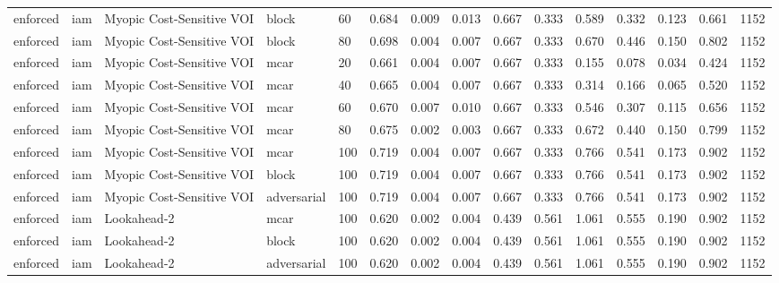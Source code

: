 \begin{table}[!ht]
{\begin{tabular}{lllllllllllllll}
enforced & iam & Myopic Cost-Sensitive VOI & block & 60 & 0.684 & 0.009 & 0.013 & 0.667 & 0.333 & 0.589 & 0.332 & 0.123 & 0.661 & 1152 \\
enforced & iam & Myopic Cost-Sensitive VOI & block & 80 & 0.698 & 0.004 & 0.007 & 0.667 & 0.333 & 0.670 & 0.446 & 0.150 & 0.802 & 1152 \\
enforced & iam & Myopic Cost-Sensitive VOI & mcar & 20 & 0.661 & 0.004 & 0.007 & 0.667 & 0.333 & 0.155 & 0.078 & 0.034 & 0.424 & 1152 \\
enforced & iam & Myopic Cost-Sensitive VOI & mcar & 40 & 0.665 & 0.004 & 0.007 & 0.667 & 0.333 & 0.314 & 0.166 & 0.065 & 0.520 & 1152 \\
enforced & iam & Myopic Cost-Sensitive VOI & mcar & 60 & 0.670 & 0.007 & 0.010 & 0.667 & 0.333 & 0.546 & 0.307 & 0.115 & 0.656 & 1152 \\
enforced & iam & Myopic Cost-Sensitive VOI & mcar & 80 & 0.675 & 0.002 & 0.003 & 0.667 & 0.333 & 0.672 & 0.440 & 0.150 & 0.799 & 1152 \\
enforced & iam & Myopic Cost-Sensitive VOI & mcar & 100 & 0.719 & 0.004 & 0.007 & 0.667 & 0.333 & 0.766 & 0.541 & 0.173 & 0.902 & 1152 \\
enforced & iam & Myopic Cost-Sensitive VOI & block & 100 & 0.719 & 0.004 & 0.007 & 0.667 & 0.333 & 0.766 & 0.541 & 0.173 & 0.902 & 1152 \\
enforced & iam & Myopic Cost-Sensitive VOI & adversarial & 100 & 0.719 & 0.004 & 0.007 & 0.667 & 0.333 & 0.766 & 0.541 & 0.173 & 0.902 & 1152 \\
enforced & iam & Lookahead-2 & mcar & 100 & 0.620 & 0.002 & 0.004 & 0.439 & 0.561 & 1.061 & 0.555 & 0.190 & 0.902 & 1152 \\
enforced & iam & Lookahead-2 & block & 100 & 0.620 & 0.002 & 0.004 & 0.439 & 0.561 & 1.061 & 0.555 & 0.190 & 0.902 & 1152 \\
enforced & iam & Lookahead-2 & adversarial & 100 & 0.620 & 0.002 & 0.004 & 0.439 & 0.561 & 1.061 & 0.555 & 0.190 & 0.902 & 1152 \\
\bottomrule
\end{tabular}}
\end{table}

